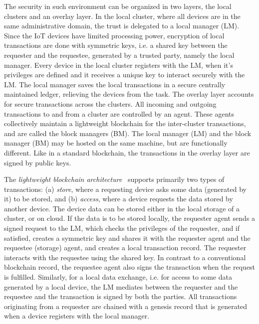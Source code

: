 The security in such environment can be organized in two layers, the local clusters and an overlay layer. In the local cluster,
where all devices are in the same administrative domain, the trust is delegated to a local manager (LM). Since the IoT devices have
limited processing power, encryption of local transactions are done with symmetric keys, i.e. a shared key between the requester
and the requestee, generated by a trusted party, namely the local manager. Every device in the local cluster registers with the
LM, when it's privileges are defined and it receives a unique key to interact securely with the LM. The local manager saves the 
local transactions in a secure centrally maintained ledger, relieving the devices from the task. 
%
The overlay layer accounts for secure transactions across the clusters. All incoming and outgoing transactions to and from
a cluster are controlled by an agent. These agents collectively maintain a lightweight blockchain for the inter-cluster transactions,
and are called the block managers (BM). The local manager (LM) and the block manager (BM) may be hosted on the same machine,
but are functionally different. Like in a standard blockchain, the transactions in the overlay layer are signed by public keys. 

 
The {\em lightweight blockchain architecture}~\citep{Dorri:2019} supports primarily two types of  transactions: (a) {\em store}, where 
a requesting device asks some data (generated by it) to be stored, and (b) {\em access}, where a device requests the data stored 
by another device. The device data can be stored either in the local storage of a cluster, or on cloud. If the data is to be stored 
locally, the requester agent sends a signed request to the LM, which checks the privileges of the requester, and if satisfied, creates 
a symmetric key and shares it with the requester agent and the requestee (storage) agent, and creates a local transaction record. 
The requester interacts with the requestee using the shared key. In contrast to a conventional blockchain record, the requestee agent 
also signs the transaction when the request is fulfilled. Similarly, for a local data exchange, i.e. for access to some data generated 
by a local device, the LM mediates between the requester and the requestee and the transaction is signed by both the parties. All 
transactions originating from a requester are chained with a genesis record that is generated when a device registers with the 
local manager.


